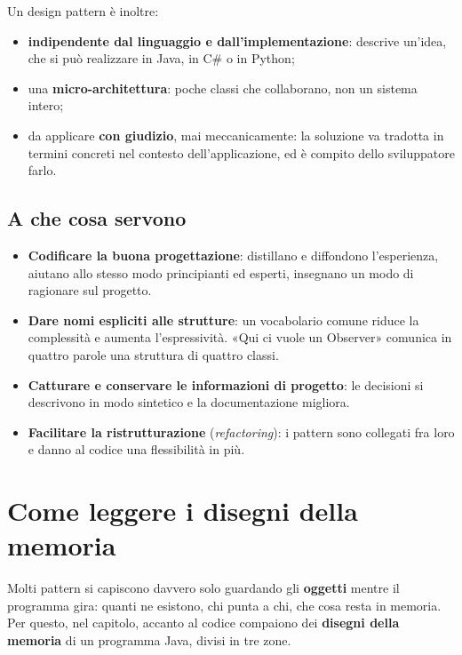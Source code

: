 Un design pattern è inoltre:
\begin{itemize}
  \item \textbf{indipendente dal linguaggio e dall'implementazione}: descrive un'idea, che si può realizzare in Java, in
        C\# o in Python;
  \item una \textbf{micro-architettura}: poche classi che collaborano, non un sistema intero;
  \item da applicare \textbf{con giudizio}, mai meccanicamente: la soluzione va tradotta in termini concreti nel contesto
        dell'applicazione, ed è compito dello sviluppatore farlo.
\end{itemize}

\subsection{A che cosa servono}

\begin{itemize}
  \item \textbf{Codificare la buona progettazione}: distillano e diffondono l'esperienza, aiutano allo stesso modo
        principianti ed esperti, insegnano un modo di ragionare sul progetto.
  \item \textbf{Dare nomi espliciti alle strutture}: un vocabolario comune riduce la complessità e aumenta
        l'espressività. «Qui ci vuole un Observer» comunica in quattro parole una struttura di quattro classi.
  \item \textbf{Catturare e conservare le informazioni di progetto}: le decisioni si descrivono in modo sintetico e la
        documentazione migliora.
  \item \textbf{Facilitare la ristrutturazione} (\textit{refactoring}): i pattern sono collegati fra loro e danno al codice
        una flessibilità in più.
\end{itemize}

\section{Come leggere i disegni della memoria}

Molti pattern si capiscono davvero solo guardando gli \textbf{oggetti} mentre il programma gira: quanti ne esistono, chi
punta a chi, che cosa resta in memoria. Per questo, nel capitolo, accanto al codice compaiono dei \textbf{disegni della
memoria} di un programma Java, divisi in tre zone.

